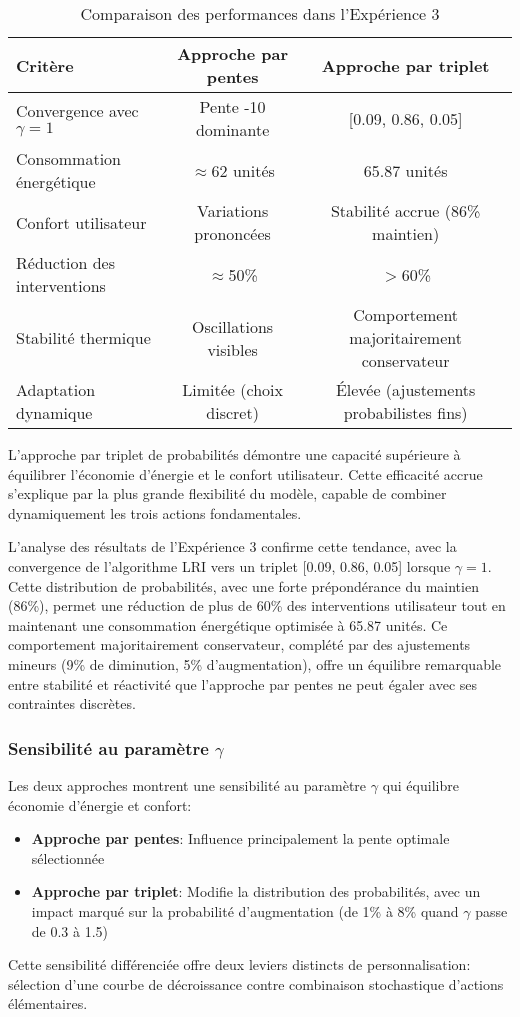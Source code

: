 \begin{table}[h]
\centering
\begin{tabular}{|l|c|c|}
\hline
\textbf{Critère} & \textbf{Approche par pentes} & \textbf{Approche par triplet} \\
\hline
Convergence avec $\gamma=1$ & Pente -10 dominante & [0.09, 0.86, 0.05] \\
\hline
Consommation énergétique & $\approx$62 unités & 65.87 unités \\
\hline
Confort utilisateur & Variations prononcées & Stabilité accrue (86\% maintien) \\
\hline
Réduction des interventions & $\approx$50\% & $>$60\% \\
\hline
Stabilité thermique & Oscillations visibles & Comportement majoritairement conservateur \\
\hline
Adaptation dynamique & Limitée (choix discret) & Élevée (ajustements probabilistes fins) \\
\hline
\end{tabular}
\caption{Comparaison des performances dans l'Expérience 3}
\label{tab:comparaison_performances_exp3}
\end{table}

L'approche par triplet de probabilités démontre une capacité supérieure à équilibrer l'économie d'énergie et le confort utilisateur. Cette efficacité accrue s'explique par la plus grande flexibilité du modèle, capable de combiner dynamiquement les trois actions fondamentales.

L'analyse des résultats de l'Expérience 3 confirme cette tendance, avec la convergence de l'algorithme LRI vers un triplet [0.09, 0.86, 0.05] lorsque $\gamma=1$. Cette distribution de probabilités, avec une forte prépondérance du maintien (86\%), permet une réduction de plus de 60\% des interventions utilisateur tout en maintenant une consommation énergétique optimisée à 65.87 unités. Ce comportement majoritairement conservateur, complété par des ajustements mineurs (9\% de diminution, 5\% d'augmentation), offre un équilibre remarquable entre stabilité et réactivité que l'approche par pentes ne peut égaler avec ses contraintes discrètes.
\subsubsection{Sensibilité au paramètre $\gamma$}

Les deux approches montrent une sensibilité au paramètre $\gamma$ qui équilibre économie d'énergie et confort:

\begin{itemize}
    \item \textbf{Approche par pentes}: Influence principalement la pente optimale sélectionnée
    \item \textbf{Approche par triplet}: Modifie la distribution des probabilités, avec un impact marqué sur la probabilité d'augmentation (de 1\% à 8\% quand $\gamma$ passe de 0.3 à 1.5)
\end{itemize}

Cette sensibilité différenciée offre deux leviers distincts de personnalisation: sélection d'une courbe de décroissance contre combinaison stochastique d'actions élémentaires.